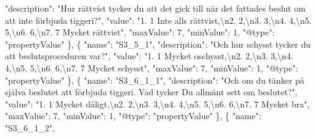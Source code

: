 \documentclass[
]{book}
\newenvironment{Shaded}{\begin{snugshade}}{\end{snugshade}}
\newcommand{\CharTok}[1]{\textcolor[rgb]{0.31,0.60,0.02}{#1}}
\newcommand{\DataTypeTok}[1]{\textcolor[rgb]{0.13,0.29,0.53}{#1}}
\newcommand{\DecValTok}[1]{\textcolor[rgb]{0.00,0.00,0.81}{#1}}
\newcommand{\FunctionTok}[1]{\textcolor[rgb]{0.00,0.00,0.00}{#1}}
\newcommand{\OtherTok}[1]{\textcolor[rgb]{0.56,0.35,0.01}{#1}}
\newcommand{\StringTok}[1]{\textcolor[rgb]{0.31,0.60,0.02}{#1}}
\begin{document}
\begin{Shaded}
\begin{Highlighting}[]
      \DataTypeTok{"description"}\FunctionTok{:} \StringTok{"Hur rättvist tycker du att det gick till när det fattades beslut om att inte förbjuda tiggeri?"}\FunctionTok{,}
      \DataTypeTok{"value"}\FunctionTok{:} \StringTok{"1. 1 Inte alls rättvist,}\CharTok{\textbackslash{}n}\StringTok{2. 2,}\CharTok{\textbackslash{}n}\StringTok{3. 3,}\CharTok{\textbackslash{}n}\StringTok{4. 4,}\CharTok{\textbackslash{}n}\StringTok{5. 5,}\CharTok{\textbackslash{}n}\StringTok{6. 6,}\CharTok{\textbackslash{}n}\StringTok{7. 7 Mycket rättvist"}\FunctionTok{,}
      \DataTypeTok{"maxValue"}\FunctionTok{:} \DecValTok{7}\FunctionTok{,}
      \DataTypeTok{"minValue"}\FunctionTok{:} \DecValTok{1}\FunctionTok{,}
      \DataTypeTok{"@type"}\FunctionTok{:} \StringTok{"propertyValue"}
    \FunctionTok{\}}\OtherTok{,}
    \FunctionTok{\{}
      \DataTypeTok{"name"}\FunctionTok{:} \StringTok{"S3_5_1"}\FunctionTok{,}
      \DataTypeTok{"description"}\FunctionTok{:} \StringTok{"Och hur schysst tycker du att beslutsproceduren var?"}\FunctionTok{,}
      \DataTypeTok{"value"}\FunctionTok{:} \StringTok{"1. 1 Mycket oschysst,}\CharTok{\textbackslash{}n}\StringTok{2. 2,}\CharTok{\textbackslash{}n}\StringTok{3. 3,}\CharTok{\textbackslash{}n}\StringTok{4. 4,}\CharTok{\textbackslash{}n}\StringTok{5. 5,}\CharTok{\textbackslash{}n}\StringTok{6. 6,}\CharTok{\textbackslash{}n}\StringTok{7. 7 Mycket schysst"}\FunctionTok{,}
      \DataTypeTok{"maxValue"}\FunctionTok{:} \DecValTok{7}\FunctionTok{,}
      \DataTypeTok{"minValue"}\FunctionTok{:} \DecValTok{1}\FunctionTok{,}
      \DataTypeTok{"@type"}\FunctionTok{:} \StringTok{"propertyValue"}
    \FunctionTok{\}}\OtherTok{,}
    \FunctionTok{\{}
      \DataTypeTok{"name"}\FunctionTok{:} \StringTok{"S3_6_1_1"}\FunctionTok{,}
      \DataTypeTok{"description"}\FunctionTok{:} \StringTok{"Och om du tänker på själva beslutet att förbjuda tiggeri. Vad tycker Du allmänt sett om beslutet?"}\FunctionTok{,}
      \DataTypeTok{"value"}\FunctionTok{:} \StringTok{"1. 1 Mycket dåligt,}\CharTok{\textbackslash{}n}\StringTok{2. 2,}\CharTok{\textbackslash{}n}\StringTok{3. 3,}\CharTok{\textbackslash{}n}\StringTok{4. 4,}\CharTok{\textbackslash{}n}\StringTok{5. 5,}\CharTok{\textbackslash{}n}\StringTok{6. 6,}\CharTok{\textbackslash{}n}\StringTok{7. 7 Mycket bra"}\FunctionTok{,}
      \DataTypeTok{"maxValue"}\FunctionTok{:} \DecValTok{7}\FunctionTok{,}
      \DataTypeTok{"minValue"}\FunctionTok{:} \DecValTok{1}\FunctionTok{,}
      \DataTypeTok{"@type"}\FunctionTok{:} \StringTok{"propertyValue"}
    \FunctionTok{\}}\OtherTok{,}
    \FunctionTok{\{}
      \DataTypeTok{"name"}\FunctionTok{:} \StringTok{"S3_6_1_2"}\FunctionTok{,}

\end{Highlighting}
\end{Shaded}
\end{document}
